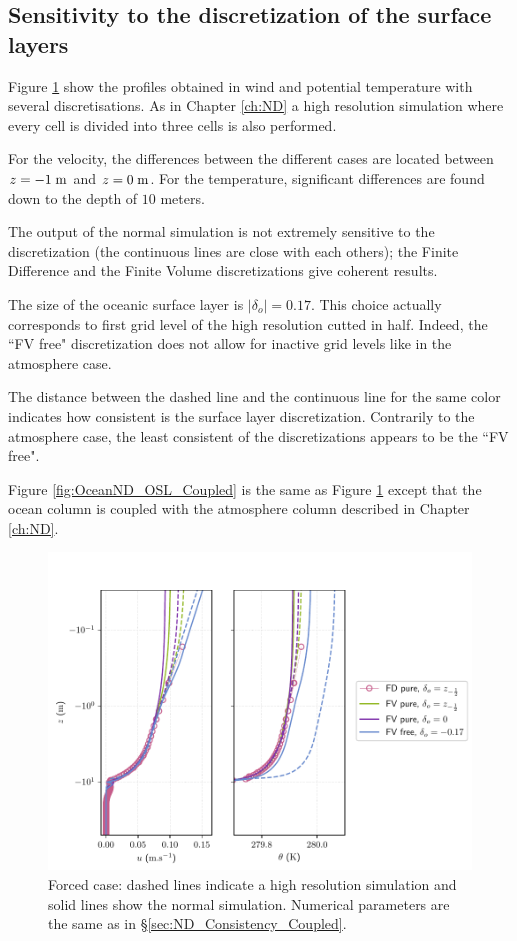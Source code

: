 \subsection{Sensitivity to the discretization
	of the surface layers}
\label{sec:ND_Ocean_bulkRadiativeFluxes}
Figure \ref{fig:OceanND_OSL_Forced}
show the profiles obtained in wind and
potential temperature with several discretisations.
As in Chapter \ref{ch:ND} a high resolution simulation
where every cell is divided into three cells
is also performed.
\par
For the velocity, the differences between
		the different cases are located between
		$z=-1\;{\rm m}$ and $z=0\;{\rm m}$.
		For the temperature, significant differences
		are found down to the depth of $10$ meters.
\par
The output of the normal simulation is not extremely sensitive
to the discretization (the continuous lines are close with each
others); the Finite Difference and the Finite Volume discretizations
give coherent results.
\par
The size of the oceanic surface layer is $|\delta_o|=0.17$.
This choice actually corresponds to first grid level
of the high resolution cutted in half.
Indeed, the ``FV free" discretization does not allow
for inactive grid levels like in the atmosphere case.
\par
The distance between the dashed line and the
continuous line for the same color indicates
how consistent is the surface layer discretization.
Contrarily to the atmosphere case, the
least consistent of the discretizations appears to
be the ``FV free".
\par
Figure \ref{fig:OceanND_OSL_Coupled} is the same as Figure 
\ref{fig:OceanND_OSL_Forced} except that the ocean column is coupled
with the atmosphere column described in Chapter \ref{ch:ND}.
\begin{figure}
	\centering
\includegraphics[scale=0.6]{images/oce_Forced.pdf}
	\caption{Forced case: dashed lines indicate
	a high resolution simulation and solid lines
	show the normal simulation. Numerical parameters
	are the same as in \S \ref{sec:ND_Consistency_Coupled}.}
	\label{fig:OceanND_OSL_Forced}
\end{figure}
